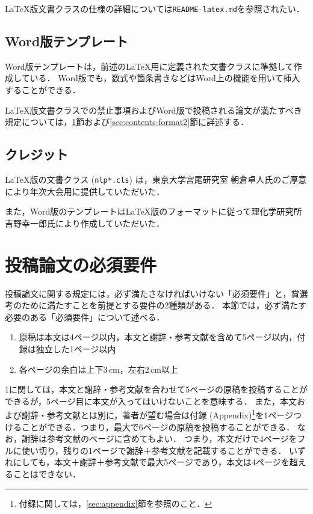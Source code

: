 \documentclass[
  platex, dvipdfmx,  %
]{nlp2025}
\newcommand{\code}[1]{\texttt{#1}}
\begin{document}
LaTeX版文書クラスの仕様の詳細については\code{README-latex.md}を参照されたい．


\subsection{Word版テンプレート}
Word版テンプレートは，前述のLaTeX用に定義された文書クラスに準拠して作成している．
Word版でも，数式や箇条書きなどはWord上の機能を用いて挿入することができる．

LaTeX版文書クラスでの禁止事項およびWord版で投稿される論文が満たすべき規定については，\ref{sec:contents-format1}節および\ref{sec:contents-format2}節に詳述する．


\subsection{クレジット}
LaTeX版の文書クラス (\code{nlp*.cls}) は，東京大学宮尾研究室 朝倉卓人氏のご厚意により年次大会用に提供していただいた．

また，Word版のテンプレートはLaTeX版のフォーマットに従って理化学研究所 吉野幸一郎氏により作成していただいた．




\section{投稿論文の必須要件}
\label{sec:contents-format1}

投稿論文に関する規定には，必ず満たさなければいけない「必須要件」と，賞選考のために満たすことを前提とする要件の2種類がある．
本節では，必ず満たす必要のある「必須要件」について述べる．

\begin{enumerate}
\item 原稿は本文は4ページ以内，本文と謝辞・参考文献を含めて5ページ以内，付録は独立した1ページ以内
\item 各ページの余白は上下3\,cm，左右2\,cm以上
\end{enumerate}

1に関しては，本文と謝辞・参考文献を合わせて5ページの原稿を投稿することができるが，5ページ目に本文が入ってはいけないことを意味する．
また，本文および謝辞・参考文献とは別に，著者が望む場合は付録 (Appendix)\footnote{付録に関しては，\ref{sec:appendix}節を参照のこと．}を1ページつけることができる．つまり，最大で6ページの原稿を投稿することができる．
なお，謝辞は参考文献のページに含めてもよい．
つまり，本文だけで4ページをフルに使い切り，残りの1ページで謝辞＋参考文献を記載することができる．
いずれにしても，本文＋謝辞＋参考文献で最大5ページであり，本文は4ページを超えることはできない．
\end{document}
